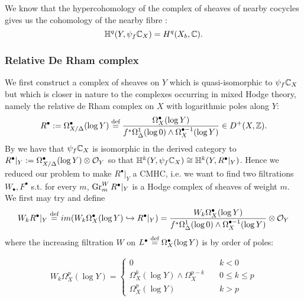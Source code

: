 \documentclass[../main.tex]{subfiles}
\begin{document}
We know that the hypercohomology of the complex of sheaves of nearby cocycles gives us the cohomology of the nearby fibre :
\[
\mathbb{H}^q(Y,\psi_f \mathbb{C}_X) = H^q(X_b, \mathbb{C}).
\]

\subsubsection{Relative De Rham complex}

We first construct a complex of sheaves on $Y$ which is quasi-isomorphic to $\psi_f \mathbb{C}_X$ but which is closer in nature to the complexes occurring in mixed Hodge theory, namely the relative de Rham complex on $X$ with logarithmic
poles along $Y$:
\[
R^\bullet := \Omega^\bullet_{X/\Delta}(\log Y) \stackrel{\text{def}}{=} \frac{\Omega^\bullet_X(\log Y)}{f^*\Omega^1_\Delta(\log 0) \wedge \Omega^{\bullet-1}_X (\log Y)} \in D^+(X,\mathbb{Z}).
\]
By \cite[Thm 11.16]{PS08}  we have that $\psi_f \mathbb{C}_X$ is isomorphic in the derived category to $R^\bullet|_Y := \Omega^\bullet_{X/\Delta}(\log Y) \otimes \mathcal{O}_Y$ so that $\mathbb{H}^k(Y,\psi_f \mathbb{C}_X) \cong \mathbb{H}^k(Y,R^\bullet|_Y) $.
Hence we reduced our problem to make  $R^\bullet|_Y$ a CMHC, i.e. we want to find two filtrations $W_\bullet, F^\bullet$ s.t. for every $m$, $\operatorname{Gr}_m^W R^\bullet|_Y$ is a Hodge complex of sheaves of weight $m$.
We first may try and define
\[
W_k R^\bullet|_Y \stackrel{\text{def}}{=} im(W_k \Omega^\bullet_X(\log Y) \hookrightarrow R^\bullet|_Y) = \frac{W_k \Omega^\bullet_X(\log Y)}{f^*\Omega^1_\Delta(\log 0) \wedge \Omega^{\bullet-1}_X (\log Y)} \otimes \mathcal{O}_Y
\]
where the increasing filtration $W$ on $L^\bullet \stackrel{\text{def}}{=} \Omega^\bullet_X(\log Y) $ is by order of poles:

\begin{eqnarray*}
W_k\Omega^{p}_{{X}}(\log Y) =  \left\{\begin{array}{ll} 
 0 &\quad k < 0 \\ 
\Omega^{k}_{{X}}(\log Y)\wedge \Omega^{p-k}_{{X}} &\quad 0 \leq k \leq p \\  
\Omega^{p}_{{X}}(\log Y) &\quad k>p  \end{array}\right.\\
\end{eqnarray*}
\end{document}
